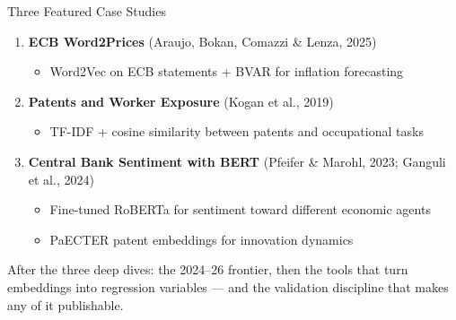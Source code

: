 \begin{frame}{Three Featured Case Studies}
\begin{enumerate}
\item \textbf{ECB Word2Prices} (Araujo, Bokan, Comazzi \& Lenza, 2025)
   \begin{itemize}
       \item Word2Vec on ECB statements + BVAR for inflation forecasting
   \end{itemize}

\medskip
\item \textbf{Patents and Worker Exposure} (Kogan et al., 2019)
   \begin{itemize}
       \item TF-IDF + cosine similarity between patents and occupational tasks
   \end{itemize}

\medskip
\item \textbf{Central Bank Sentiment with BERT} (Pfeifer \& Marohl, 2023; Ganguli et al., 2024)
   \begin{itemize}
       \item Fine-tuned RoBERTa for sentiment toward different economic agents
       \item PaECTER patent embeddings for innovation dynamics
   \end{itemize}
\end{enumerate}

\medskip
After the three deep dives: the 2024--26 frontier, then the tools that turn embeddings into regression variables --- and the validation discipline that makes any of it publishable.
\end{frame}

